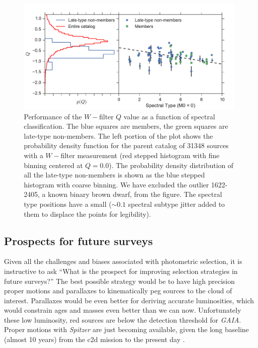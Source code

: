 \begin{figure}[ht!]
  \caption{ Performance of the $W-$filter $Q$ value as a function of spectral classification.  The blue squares are members, the green squares are late-type non-members.  The left portion of the plot shows the probability density function for the parent catalog of 31348 sources with a $W-$filter measurement (red stepped histogram with fine binning centered at $Q=0.0$).  The probability density distribution of all the late-type non-members is shown as the blue stepped histogram with coarse binning. We have excluded the outlier 1622-2405, a known binary brown dwarf, from the figure.  The spectral type positions have a small ($\sim0.1$ spectral subtype jitter added to them to displace the points for legibility).\label{fig_W_results} }
\centering
\includegraphics[scale=0.6]{chIMACS/figures/W_filter_results}
\end{figure}

\subsection{Prospects for future surveys}
Given all the challenges and biases associated with photometric selection, it is instructive to ask ``What is the prospect for improving selection strategies in future surveys?''  The best possible strategy would be to have high precision proper motions and parallaxes to kinematically peg sources to the cloud of interest.  Parallaxes would be even better for deriving accurate luminosities, which would constrain ages and masses even better than we can now.  Unfortunately these low luminosity, red sources are below the detection threshold for \emph{GAIA}.  Proper motions with \emph{Spitzer} are just becoming available, given the long baseline (almost 10 years) from the c2d mission to the present day \citep{2012sptz.prop90071K}.

